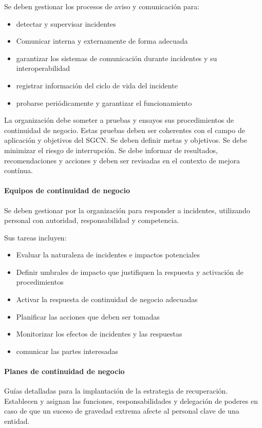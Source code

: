             Se deben gestionar los procesos de aviso y comunicación para:
            \begin{itemize}
                \item detectar y supervisar incidentes
                \item Comunicar interna y externamente de forma adecuada
                \item garantizar los sistemas de comunicación durante incidentes y su interoperabilidad
                \item registrar información del ciclo de vida del incidente
                \item probarse periódicamente y garantizar el funcionamiento
            \end{itemize}

            La organización debe someter a pruebas y ensayos sus procedimientos de continuidad de negocio. Estas pruebas deben ser coherentes con el campo de aplicación y objetivos del SGCN. Se deben definir metas y objetivos. Se debe minimizar el riesgo de interrupción. Se debe informar de resultados, recomendaciones y acciones y deben ser revisadas en el contexto de mejora contínua.

        \paragraph{Equipos de continuidad de negocio}
            Se deben gestionar por la organización para responder a incidentes, utilizando personal con autoridad, responsabilidad y competencia. 

            Sus tareas incluyen:
            \begin{itemize}
                \item Evaluar la naturaleza de incidentes e impactos potenciales
                \item Definir umbrales de impacto que justifiquen la respuesta y activación de procedimientos
                \item Activar la respuesta de continuidad de negocio adecuadas
                \item Planificar las acciones que deben ser tomadas
                \item Monitorizar los efectos de incidentes y las respuestas
                \item comunicar las partes interesadas
            \end{itemize}

        \paragraph{Planes de continuidad de negocio}
            Guías detalladas para la implantación de la estrategia de recuperación. Establecen y asignan las funciones, responsabilidades y delegación de poderes en caso de que un suceso de gravedad extrema afecte al personal clave de una entidad.

